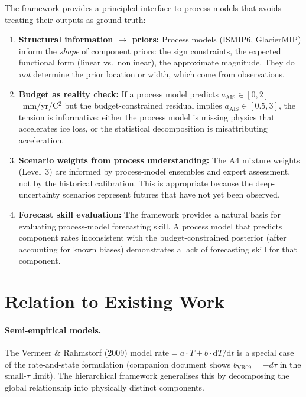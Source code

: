 \documentclass[11pt]{article}
\begin{document}
The framework provides a principled interface to process models that avoids treating their outputs as ground truth:

\begin{enumerate}
  \item \textbf{Structural information $\to$ priors:} Process models (ISMIP6, GlacierMIP) inform the \emph{shape} of component priors: the sign constraints, the expected functional form (linear vs.\ nonlinear), the approximate magnitude.  They do \emph{not} determine the prior location or width, which come from observations.

  \item \textbf{Budget as reality check:} If a process model predicts $a_{\text{AIS}} \in [0, 2]$~mm/yr/\textdegree C$^2$ but the budget-constrained residual implies $a_{\text{AIS}} \in [0.5, 3]$, the tension is informative: either the process model is missing physics that accelerates ice loss, or the statistical decomposition is misattributing acceleration.

  \item \textbf{Scenario weights from process understanding:} The A4 mixture weights (Level~3) are informed by process-model ensembles and expert assessment, not by the historical calibration.  This is appropriate because the deep-uncertainty scenarios represent futures that have not yet been observed.

  \item \textbf{Forecast skill evaluation:} The framework provides a natural basis for evaluating process-model forecasting skill.  A process model that predicts component rates inconsistent with the budget-constrained posterior (after accounting for known biases) demonstrates a lack of forecasting skill for that component.
\end{enumerate}


\section{Relation to Existing Work}
\label{sec:existing}

\paragraph{Semi-empirical models.}  The Vermeer \& Rahmstorf (2009) model $\text{rate} = a \cdot T + b \cdot \mathrm{d}T/\mathrm{d}t$ is a special case of the rate-and-state formulation (companion document shows $b_{\text{VR09}} = -d\tau$ in the small-$\tau$ limit).  The hierarchical framework generalises this by decomposing the global relationship into physically distinct components.
\end{document}
